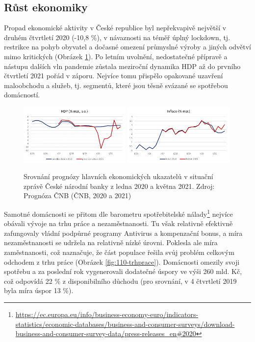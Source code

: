 \subsection*{Růst ekonomiky} 
Propad ekonomické aktivity v České republice byl nepřekvapivě největší v druhém čtvrtletí 2020 (-10,8  \%), v návaznosti na téměř úplný lockdown, tj. restrikce na pohyb obyvatel a dočasné omezení průmyslné výroby a jiných odvětví mimo kritických (Obrázek \ref{fig:110-HDP}). Po letním uvolnění, nedostatečné přípravě a nástupu dalších vln pandemie zůstala meziroční dynamika HDP až do prvního čtvrtletí 2021 pořád v záporu. Nejvíce tomu přispělo opakované uzavření maloobchodu a služeb, tj. segmentů, které jsou těsně svázané se spotřebou domácností. 

\begin{figure}[ht]
    \centering
    \includegraphics[width=0.49\textwidth]{./pic/HDP.png} \includegraphics[width=0.49\textwidth]{./pic/inflace.png}
    \caption{Srovnání prognózy hlavních ekonomických ukazatelů v situační zprávě České národní banky z ledna 2020 a května 2021. Zdroj: Prognóza ČNB (ČNB, 2020 a 2021)}
    \label{fig:110-HDP}
\end{figure} 

Samotné domácnosti se přitom dle barometru spotřebitelské nálady\footnote{\url{https://ec.europa.eu/info/business-economy-euro/indicators-statistics/economic-databases/business-and-consumer-surveys/download-business-and-consumer-survey-data/press-releases_en\#2020}} nejvíce obávali vývoje na trhu práce a nezaměstnanosti. Tu však relativně efektivně zafungovaly vládní podpůrné programy Antivirus a kompenzační bonus, a míra nezaměstnanosti se udržela na relativně nízké úrovni. Poklesla ale míra za\-měst\-na\-nos\-ti, což naznačuje, že část populace řešila svůj problém celkovým odchodem z trhu práce (Obrázek \ref{fig:110-trhprace}). Domácnosti omezily svoji spotřebu a za poslední rok vygenerovali dodatečné úspory ve výši 260 mld. Kč, což odpovídá 22 \% z disponibilního důchodu (pro srovnání, v 4 čtvrtletí 2019 byla míra úspor 13 \%). 

